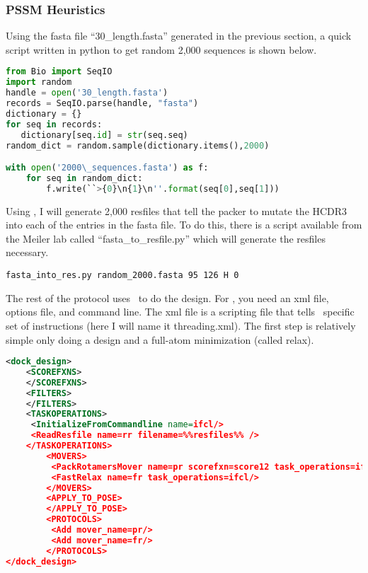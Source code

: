 \subsubsection{PSSM Heuristics}

Using the fasta file ``30\_length.fasta'' generated in the previous section, a quick script written in python to get random 2,000 sequences is shown below.

\begin{lstlisting}[breaklines=true, language=python]
from Bio import SeqIO
import random
handle = open('30_length.fasta')
records = SeqIO.parse(handle, "fasta")
dictionary = {}
for seq in records:
   dictionary[seq.id] = str(seq.seq)
random_dict = random.sample(dictionary.items(),2000)

with open('2000\_sequences.fasta') as f:
    for seq in random_dict:
        f.write(``>{0}\n{1}\n''.format(seq[0],seq[1]))
\end{lstlisting}

Using \rosettadesign, I will generate 2,000 resfiles that tell the packer to mutate the HCDR3 into each of the entries in the fasta file. To do this, there is a script available from the Meiler lab called ``fasta\_to\_resfile.py'' which will generate the resfiles necessary.

\begin{lstlisting}[breaklines=true]
fasta_into_res.py random_2000.fasta 95 126 H 0
\end{lstlisting}

The rest of the protocol uses \scripts~to do the design. For \scripts, you need an xml file, options file, and command line. The xml file is a scripting file that tells \rosetta~specific set of instructions (here I will name it threading.xml). The first step is relatively simple only doing a design and a full-atom minimization (called relax).

\begin{lstlisting}[breaklines=true, language=xml]
<dock_design>
    <SCOREFXNS>
    </SCOREFXNS>
    <FILTERS>
    </FILTERS>
    <TASKOPERATIONS>
     <InitializeFromCommandline name=ifcl/>
     <ReadResfile name=rr filename=%%resfiles%% />
    </TASKOPERATIONS>
        <MOVERS>
         <PackRotamersMover name=pr scorefxn=score12 task_operations=ifcl,rr/>
         <FastRelax name=fr task_operations=ifcl/>
        </MOVERS>
        <APPLY_TO_POSE>
        </APPLY_TO_POSE>
        <PROTOCOLS>
         <Add mover_name=pr/>
         <Add mover_name=fr/>
        </PROTOCOLS>
</dock_design>
\end{lstlisting}

